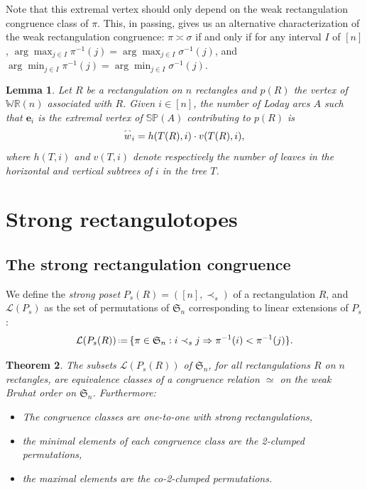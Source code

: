 \documentclass{amsart}
\newtheorem{theorem}{Theorem}%
\newtheorem{lemma}[theorem]{Lemma}
\theoremstyle{definition}
\newcommand{\f}[1]{\mathfrak{#1}} %
\newcommand{\eqdef}{\mbox{\,\raisebox{0.2ex}{\scriptsize\ensuremath{\mathrm:}}\ensuremath{=}\,}} %
\renewcommand{\implies}{\Rightarrow} %
\newcommand{\darkblue}{\color{darkblue}} %
\newcommand{\defn}[1]{\textsl{\darkblue #1}} %
\newcommand{\polytope}[1]{\mathds{#1}} %
\newcommand{\WRP}{\polytope{WR}} %
\newcommand{\SP}{\polytope{SP}}
\newcommand{\loday}[1]{\smash{\overset{\frown}{#1}}}
\newcommand{\baxtereq}{\asymp}%
\newcommand{\strongeq}{\simeq}%
\begin{document}
Note that this extremal vertex should only depend on the weak rectangulation congruence class of $\pi$.
This, in passing, gives us an alternative characterization of the weak rectangulation congruence:
$\pi\baxtereq\sigma$ if and only if for any interval $I$ of $[n]$,
$\arg\max_{j\in I} \pi^{-1}(j)=\arg\max_{j\in I} \sigma^{-1}(j)$, and
$\arg\min_{j\in I} \pi^{-1}(j)=\arg\min_{j\in I} \sigma^{-1}(j)$.

\begin{lemma}
  Let $R$ be a rectangulation on $n$ rectangles and $p(R)$ the vertex of $\WRP(n)$ associated with $R$.
  Given $i\in [n]$, the number of Loday arcs $A$ such that $\mathbf{e}_i$ is the extremal vertex of $\SP(A)$ contributing to $p(R)$ is
  \[
  \loday{w}_i =  h(T(R), i)\cdot v(T(R),i),
  \]
   where $h(T,i)$ and $v(T,i)$ denote respectively the number of leaves in the horizontal and vertical subtrees of $i$ in the tree $T$.
\end{lemma}


\section{Strong rectangulotopes}
\label{sec:sr}

\subsection{The strong rectangulation congruence}

We define the \defn{strong poset} $P_s(R)=([n],\prec_s)$ of a rectangulation $R$, and $\mathcal{L}(P_s)$ as the set of permutations of $\f{S}_n$ corresponding to linear extensions of $P_s$:
\[
\mathcal{L}(P_s(R)) \eqdef \{\pi\in\f{S}_n : i\prec_s j\implies \pi^{-1}(i) < \pi^{-1}(j)\}.
\]

\begin{theorem}
  The subsets $\mathcal{L}(P_s(R))$ of $\f{S}_n$, for all rectangulations $R$ on $n$ rectangles, 
  are equivalence classes of a congruence relation $\strongeq$ on the weak Bruhat order on $\f{S}_n$.
    Furthermore:
  \begin{itemize}
  \item The congruence classes are one-to-one with strong rectangulations,  
  \item the minimal elements of each congruence class are the 2-clumped permutations,
  \item the maximal elements are the co-2-clumped permutations.
  \end{itemize}
\end{theorem}
\end{document}

